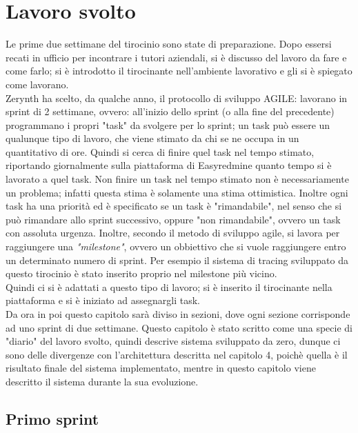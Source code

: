 \documentclass[a4paper,12pt,titlepage,italian,openany]{report}
\begin{document}
\newpage
\chapter{Lavoro svolto}
Le prime due settimane del tirocinio sono state di preparazione. Dopo essersi recati in ufficio per incontrare i tutori aziendali, si è discusso
del lavoro da fare e come farlo; si è introdotto il tirocinante nell'ambiente lavorativo e gli si è spiegato come lavorano.\\
Zerynth ha scelto, da qualche anno, il protocollo di sviluppo AGILE: lavorano in sprint di 2 settimane, ovvero: all'inizio dello sprint (o alla fine del precedente) programmano i propri "task" da svolgere per lo sprint; un task può essere un qualunque tipo di lavoro, che viene stimato da chi se ne occupa in un quantitativo di ore. Quindi si cerca di finire quel task nel tempo stimato, riportando giornalmente sulla piattaforma di Easyredmine quanto tempo si è lavorato a quel task.
Non finire un task nel tempo stimato non è necessariamente un problema; infatti questa stima è solamente una stima ottimistica. Inoltre ogni task ha una priorità ed è specificato se un task è "rimandabile", nel senso che si può rimandare allo sprint successivo, oppure "non rimandabile", ovvero un task con assoluta urgenza. Inoltre, secondo il metodo di sviluppo agile,  si lavora per raggiungere una \textit{"milestone"}, ovvero un obbiettivo che si vuole raggiungere entro un determinato numero di sprint. Per esempio il sistema di tracing sviluppato da questo tirocinio è stato inserito proprio nel milestone più  vicino.\\
Quindi ci si è adattati a questo tipo di lavoro; si è inserito il tirocinante nella piattaforma e si è iniziato ad assegnargli task.\\
Da ora in poi questo capitolo sarà diviso in sezioni, dove ogni sezione corrisponde ad uno sprint di due settimane.
Questo capitolo è stato scritto come una specie di "diario" del lavoro svolto, quindi descrive sistema sviluppato da zero, dunque ci sono delle divergenze con l'architettura descritta nel capitolo 4, poichè quella è il risultato finale del sistema implementato, mentre in questo capitolo viene descritto il sistema durante la sua evoluzione.
\section{Primo sprint}
\end{document}
